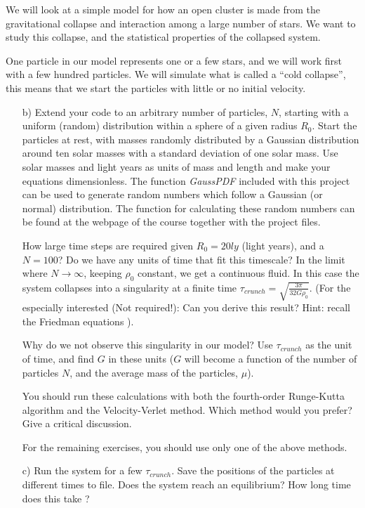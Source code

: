 \documentclass[11pt,a4wide]{article}
\begin{document}
We will look at a simple model for how an open cluster is made from
the gravitational collapse and interaction among a large number of
stars. We want to study this collapse, and the statistical properties
of the collapsed system.

One particle in our model represents one or a few stars, and we will
work first with a few hundred particles. We will simulate what is called a
``cold collapse'', this means that we start the particles with little
or no initial velocity.
\begin{enumerate}
\item[b)] Extend your code to an arbitrary number of particles, $N$,
  starting with a uniform (random) distribution within a sphere of a
  given radius $R_0$. Start the particles at rest, with masses
  randomly distributed by a Gaussian distribution around ten solar
  masses with a standard deviation of one solar mass. Use solar masses
  and light years as units of mass and length and make your equations dimensionless.
The function {\em GaussPDF} included with this project can be used to generate 
random numbers which follow a Gaussian (or normal) distribution.  The function for calculating these random numbers can be found at the webpage of the course together with the project files.

How large time steps are required given $R_0 = 20 ly$
(light years), and a $N = 100$? Do we have any units of time that fit
this timescale?   
In the limit where $N \rightarrow \infty$, keeping $\rho_0$ constant,
we get a continuous fluid. In this case the system collapses into a
singularity at a finite time $\tau_{crunch} = \sqrt{\frac{3\pi}{32G\rho_0}}$. 
(For the especially interested (Not required!): Can
you derive this result? Hint: recall the Friedman equations \cite{friedmaneqs}).

Why do we not observe this singularity in our model? Use
$\tau_{crunch}$ as the unit of time, and find $G$ in these units ($G$
will become a function of the number of particles $N$, and the average
mass of the particles, $\mu$).

You should run these calculations with both the fourth-order Runge-Kutta algorithm
and the Velocity-Verlet method. Which method would you prefer? Give a critical discussion.

For the remaining exercises, you should use only one of the above methods. 

\item[c)] Run the system for a few $\tau_{crunch}$. Save the positions
  of the particles at different times to file. Does the system
  reach an equilibrium? How long time does this take ?


\end{enumerate}
\end{document}
